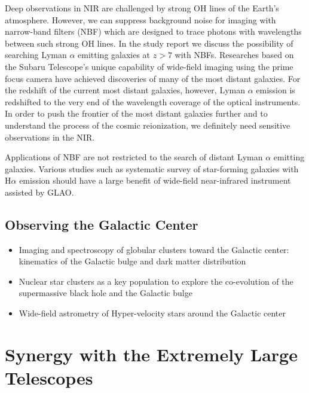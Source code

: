 Deep observations in NIR are challenged by strong OH lines of
the Earth's atmosphere. However, we can suppress background noise for
imaging with narrow-band filters (NBF) which are designed to trace
photons with wavelengths between such strong OH lines. 
In the study report
we discuss the possibility of searching Lyman
$\alpha$ emitting galaxies at $z>7$ with NBFs.
Researches based on the Subaru Telescope's unique capability of
wide-field imaging using the prime focus camera have achieved
discoveries of many of the most distant galaxies. For the redshift of
the current most distant galaxies, however, Lyman $\alpha$ emission is
redshifted to the very end of the wavelength coverage of the optical
instruments. In order to push the frontier of the most distant galaxies
further and to understand the process of the cosmic reionization, we
definitely need sensitive observations in the NIR.

Applications of NBF are not restricted to the search of distant Lyman
$\alpha$ emitting galaxies. Various studies such as systematic survey of
star-forming galaxies with H$\alpha$ emission should have a large
benefit of wide-field near-infrared instrument assisted by GLAO.


\subsection{Observing the Galactic Center}

\begin{itemize}
 \setlength{\itemsep}{-3pt}
 \item Imaging and spectroscopy of globular clusters toward the Galactic
       center: kinematics of the Galactic bulge and dark matter
       distribution
 \item Nuclear star clusters as a key population to explore the
       co-evolution of the supermassive black hole and the Galactic bulge
 \item Wide-field astrometry of Hyper-velocity stars around the Galactic
       center
\end{itemize}


\section{Synergy with the Extremely Large Telescopes}

